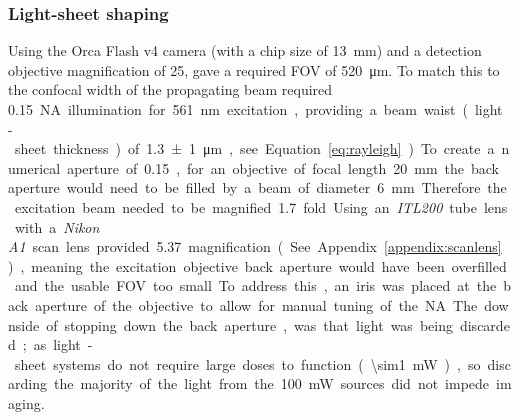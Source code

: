 
\subsubsection{Light-sheet shaping} %


Using the Orca Flash v4 camera (with a chip size of \SI{13}{\milli\meter}) and a detection objective magnification of \SI{25}{\times}, gave a required \acrshort{FOV} of \SI{520}{\micro\meter}.
To match this to the confocal width of the propagating beam required \SI{0.15} %
NA illumination for \SI{561}{\nano\meter} excitation, providing a beam waist (light-sheet thickness) of \SI{1.3 \pm 1}{\micro\meter}, see Equation \ref{eq:rayleigh}).
To create a numerical aperture of \SI{0.15}, for an objective of focal length \SI{20}{\milli\meter} the back aperture would need to be filled by a beam of diameter \SI{6}{\milli\meter}.
Therefore the excitation beam needed to be magnified \SI{1.7}{} fold.

Using an \emph{ITL200} tube lens with a \emph{Nikon A1} scan lens provided \SI{5.37}{\times} magnification (See Appendix \ref{appendix:scanlens}), meaning the excitation objective back aperture would have been overfilled and the usable \acrshort{FOV} too small.
To address this, an iris was placed at the back aperture of the objective to allow for manual tuning of the \acrshort{NA}.
The downside of stopping down the back aperture, was that light was being discarded; as light-sheet systems do not require large doses to function (\SI{\sim1}{\milli\watt}), so discarding the majority of the light from the \SI{100}{\milli\watt} sources did not impede imaging.


